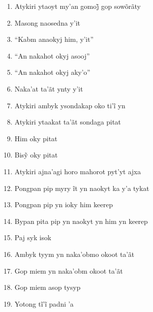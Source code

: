 \begin{enumerate}
 \item Atykiri ytaoyt my’an gomoj̃ gop sowõrãty

 \item Masong naosedna y'it

 \item ``Kabm anaokyj him, y'it''

 \item ``An nakahot okyj asooj''

 \item ``An nakahot okyj aky'o''

 \item Naka'at ta'ãt ynty y'it

 \begin{center}\end{center}

 \item Atykiri ambyk ysondakap oko ti’ĩ yn

 \item Atykiri ytaakat ta'ãt sondaga pitat

 \item Him oky pitat

 \item Bisỹ oky pitat

 \item Atykiri ajna'agi horo mahorot pyt'yt ajxa

 \begin{center}\end{center}

 \item Pongpan pip myry ĩt yn naokyt ka y’a tykat

 \item Pongpan pip yn ioky him keerep

 \item Bypan pita pip yn naokyt yn him yn keerep

 \item Paj syk isok

 \begin{center}\end{center}

 \item Ambyk tyym yn naka'obmo okoot ta'ãt

 \item Gop miem yn naka'obm okoot ta'ãt

 \item Gop miem asop tysyp

 \item Yotong tĩ’ĩ padni ’a


\end{enumerate}
